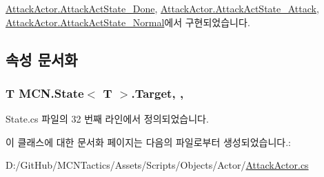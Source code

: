 \hyperlink{class_attack_actor_1_1_attack_act_state___done_a87dc9fe06b7132e7eff68fce885c2cd2}{Attack\+Actor.\+Attack\+Act\+State\+\_\+\+Done}, \hyperlink{class_attack_actor_1_1_attack_act_state___attack_a2755f4dae2cf1f80a94b6bcc973d1bfd}{Attack\+Actor.\+Attack\+Act\+State\+\_\+\+Attack}, \hyperlink{class_attack_actor_1_1_attack_act_state___normal_a7d6644fed269325b8f62138d8adb50f5}{Attack\+Actor.\+Attack\+Act\+State\+\_\+\+Normal}에서 구현되었습니다.



\subsection{속성 문서화}
\subsubsection[{\texorpdfstring{Target}{Target}}]{\setlength{\rightskip}{0pt plus 5cm}T {\bf M\+C\+N.\+State}$<$ T $>$.Target\hspace{0.3cm}{\ttfamily [get]}, {\ttfamily [protected]}, {\ttfamily [inherited]}}\hypertarget{class_m_c_n_1_1_state_a93ba2fd920292031bd6e65b1dc505cb3}{}\label{class_m_c_n_1_1_state_a93ba2fd920292031bd6e65b1dc505cb3}


State.\+cs 파일의 32 번째 라인에서 정의되었습니다.



이 클래스에 대한 문서화 페이지는 다음의 파일로부터 생성되었습니다.\+:\begin{DoxyCompactItemize}
\item 
D\+:/\+Git\+Hub/\+M\+C\+N\+Tactics/\+Assets/\+Scripts/\+Objects/\+Actor/\hyperlink{_attack_actor_8cs}{Attack\+Actor.\+cs}\end{DoxyCompactItemize}
